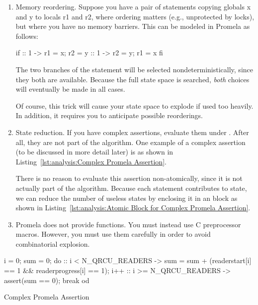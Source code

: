 \begin{enumerate}
\item	Memory reordering.  Suppose you have a pair of statements
	copying globals x and y to locals r1 and r2, where ordering
	matters (e.g., unprotected by locks), but where you have
	no memory barriers.  This can be modeled in Promela as follows:

\begin{VerbatimN}[samepage=true]
if
:: 1 -> r1 = x;
        r2 = y
:: 1 -> r2 = y;
        r1 = x
fi
\end{VerbatimN}

	The two branches of the  statement will be selected
	nondeterministically, since they both are available.
	Because the full state space is searched, \emph{both} choices
	will eventually be made in all cases.

	Of course, this trick will cause your state space to explode
	if used too heavily.
	In addition, it requires you to anticipate possible reorderings.

\item	State reduction.  If you have complex assertions, evaluate
	them under .  After all, they are not part of the
	algorithm.  One example of a complex assertion (to be discussed
	in more detail later) is as shown in
	Listing~\ref{lst:analysis:Complex Promela Assertion}.

	There is no reason to evaluate this assertion
	non-atomically, since it is not actually part of the algorithm.
	Because each statement contributes to state, we can reduce
	the number of useless states by enclosing it in an 
	block as shown in
	Listing~\ref{lst:analysis:Atomic Block for Complex Promela Assertion}.

\item	Promela does not provide functions.
	You must instead use C preprocessor macros.
	However, you must use them carefully in order to avoid
	combinatorial explosion.
\end{enumerate}

\begin{listing}[tbp]
\begin{VerbatimL}
i = 0;
sum = 0;
do
:: i < N_QRCU_READERS ->
	sum = sum + (readerstart[i] == 1 &&
	             readerprogress[i] == 1);
	i++
:: i >= N_QRCU_READERS ->
	assert(sum == 0);
	break
od
\end{VerbatimL}
\caption{Complex Promela Assertion}
\label{lst:analysis:Complex Promela Assertion}
\end{listing}

